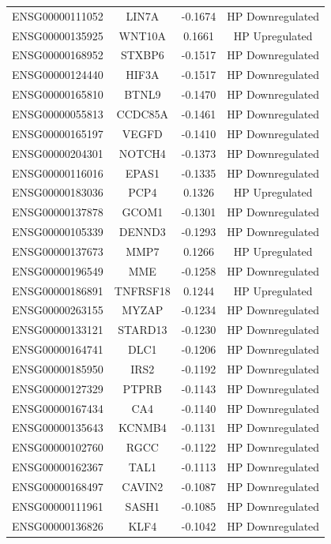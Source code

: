 \documentclass[
]{article}
\begin{document}
\begin{singlespace}
\begin{longtable}[t]{lccc}
\endfoot
\bottomrule
\endlastfoot
ENSG00000111052 & LIN7A & -0.1674 & HP Downregulated\\
ENSG00000135925 & WNT10A & 0.1661 & HP Upregulated\\
ENSG00000168952 & STXBP6 & -0.1517 & HP Downregulated\\
ENSG00000124440 & HIF3A & -0.1517 & HP Downregulated\\
ENSG00000165810 & BTNL9 & -0.1470 & HP Downregulated\\
\addlinespace
ENSG00000055813 & CCDC85A & -0.1461 & HP Downregulated\\
ENSG00000165197 & VEGFD & -0.1410 & HP Downregulated\\
ENSG00000204301 & NOTCH4 & -0.1373 & HP Downregulated\\
ENSG00000116016 & EPAS1 & -0.1335 & HP Downregulated\\
ENSG00000183036 & PCP4 & 0.1326 & HP Upregulated\\
\addlinespace
ENSG00000137878 & GCOM1 & -0.1301 & HP Downregulated\\
ENSG00000105339 & DENND3 & -0.1293 & HP Downregulated\\
ENSG00000137673 & MMP7 & 0.1266 & HP Upregulated\\
ENSG00000196549 & MME & -0.1258 & HP Downregulated\\
ENSG00000186891 & TNFRSF18 & 0.1244 & HP Upregulated\\
\addlinespace
ENSG00000263155 & MYZAP & -0.1234 & HP Downregulated\\
ENSG00000133121 & STARD13 & -0.1230 & HP Downregulated\\
ENSG00000164741 & DLC1 & -0.1206 & HP Downregulated\\
ENSG00000185950 & IRS2 & -0.1192 & HP Downregulated\\
ENSG00000127329 & PTPRB & -0.1143 & HP Downregulated\\
\addlinespace
ENSG00000167434 & CA4 & -0.1140 & HP Downregulated\\
ENSG00000135643 & KCNMB4 & -0.1131 & HP Downregulated\\
ENSG00000102760 & RGCC & -0.1122 & HP Downregulated\\
ENSG00000162367 & TAL1 & -0.1113 & HP Downregulated\\
ENSG00000168497 & CAVIN2 & -0.1087 & HP Downregulated\\
\addlinespace
ENSG00000111961 & SASH1 & -0.1085 & HP Downregulated\\
ENSG00000136826 & KLF4 & -0.1042 & HP Downregulated\\

\end{longtable}
\end{singlespace}
\end{document}
